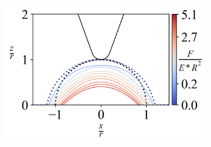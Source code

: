 \begin{figure}[H]
\begin{subfigure}{0.32\textwidth}
    \end{subfigure}
    \hfill     
    \begin{subfigure}{0.32\textwidth}
        \centering
        \caption{\label{fig: All-Hemisphere-LineContour-1}}
        \includegraphics[width=1\linewidth]{Figures/Hemisphere-LineContour-1.png}
    \end{subfigure}



    \hfill
    \vspace{-0.3in}



\end{figure}

